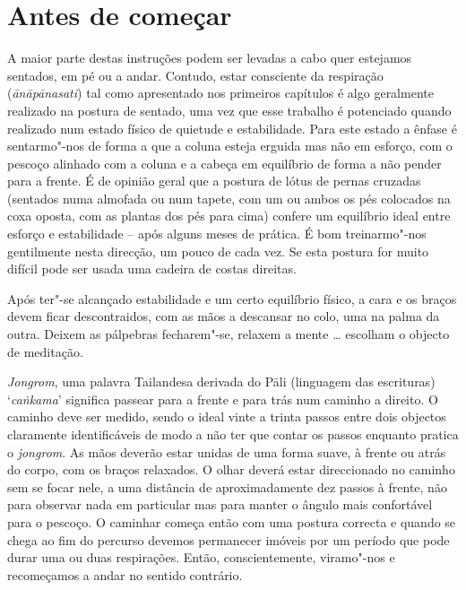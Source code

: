 \chapter{Antes de começar}

A maior parte destas instruções podem ser levadas a cabo quer estejamos
sentados, em pé ou a andar. Contudo, estar consciente da respiração
(\emph{ānāpānasati}) tal como apresentado nos primeiros capítulos é algo
geralmente realizado na postura de sentado, uma vez que esse trabalho é
potenciado quando realizado num estado físico de quietude e
estabilidade. Para este estado a ênfase é sentarmo"-nos de forma a que a
coluna esteja erguida mas não em esforço, com o pescoço alinhado com a
coluna e a cabeça em equilíbrio de forma a não pender para a frente. É
de opinião geral que a postura de lótus de pernas cruzadas (sentados
numa almofada ou num tapete, com um ou ambos os pés colocados na coxa
oposta, com as plantas dos pés para cima) confere um equilíbrio ideal
entre esforço e estabilidade -- após alguns meses de prática. É bom
treinarmo"-nos gentilmente nesta direcção, um pouco de cada vez. Se esta
postura for muito difícil pode ser usada uma cadeira de costas direitas.

Após ter"-se alcançado estabilidade e um certo equilíbrio físico, a cara
e os braços devem ficar descontraidos, com as mãos a descansar no colo,
uma na palma da outra. Deixem as pálpebras fecharem"-se, relaxem a mente
\ldots{} escolham o objecto de meditação.

\emph{Jongrom}, uma palavra Tailandesa derivada do Pāli (linguagem das
escrituras) `\emph{caṅkama}' significa passear para a frente e para trás
num caminho a direito. O caminho deve ser medido, sendo o ideal vinte a
trinta passos entre dois objectos claramente
identificáveis de modo a não ter que contar os passos enquanto
pratica o \emph{jongrom}. As mãos deverão estar unidas de uma forma
suave, à frente ou atrás do corpo, com os braços relaxados. O olhar
deverá estar direccionado no caminho sem se focar nele, a uma distância
de aproximadamente dez passos à frente, não para observar nada em
particular mas para manter o ângulo mais confortável para o pescoço. O
caminhar começa então com uma postura correcta e quando se chega ao fim
do percurso devemos permanecer imóveis por um período que pode durar uma
ou duas respirações. Então, conscientemente, viramo"-nos e recomeçamos a
andar no sentido contrário.


